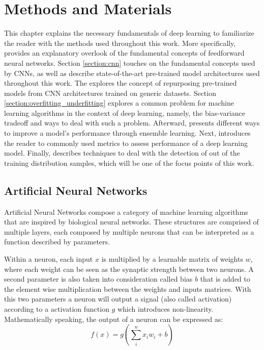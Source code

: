 \chapter{Methods and Materials}
\label{chapter:mam}

This chapter explains the necessary fundamentals of deep learning to familiarize the reader with the methods used throughout this work. More specifically,  provides an explanatory overlook of the fundamental concepts of feedforward neural networks. Section \ref{section:cnn} touches on the fundamental concepts used by \ac{CNN}s, as well as describe state-of-the-art pre-trained model architectures used throughout this work. The  explores the concept of repurposing pre-trained models from \ac{CNN} architectures trained on generic datasets. Section \ref{section:overfitting_underfitting} explores a common problem for machine learning algorithms in the context of deep learning, namely, the bias-variance tradeoff and ways to deal with such a problem. Afterward,  presents different ways to improve a model's performance through ensemble learning. Next,  introduces the reader to commonly used metrics to assess performance of a deep learning model. Finally,  describes techniques to deal with the detection of out of the training distribution samples, which will be one of the focus points of this work. 

\section{Artificial Neural Networks}
\label{section:ann}
    Artificial Neural Networks compose a category of machine learning algorithms that are inspired by biological neural networks. These structures are comprised of multiple layers, each composed by multiple neurons that can be interpreted as a function described by parameters. \par
    
    Within a neuron, each input $x$ is multiplied by a learnable matrix of weights $w$, where each weight can be seen as the synaptic strength between two neurons. A second parameter is also taken into consideration called bias $b$ that is added to the element wise multiplication between the weights and inputs matrices. With this two parameters a neuron will output a signal (also called activation) according to a activation function $g$ which introduces non-linearity. Mathematically speaking, the output of a neuron can be expressed as:
    \begin{equation}
        f(x)=g(\sum_{i}^{n} x_i w_i + b)
        \label{eqs:neuron}
    \end{equation}
    
